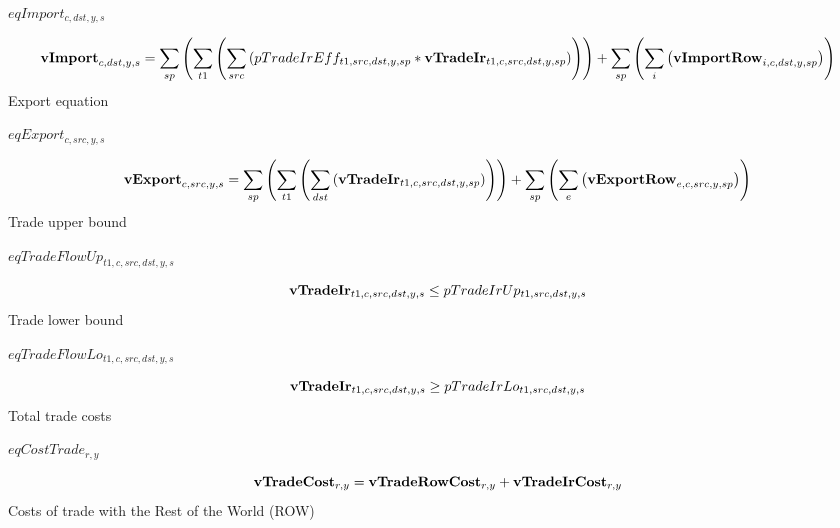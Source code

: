 \documentclass{article}
\begin{document}
$eqImport_{c,dst,y,s}$





\begin{dmath} 
{\bf vImport}_{c,dst,y,s}  =  \sum_{sp}{\left(\sum_{t1}{\left(\sum_{src}{\left(pTradeIrEff_{t1,src,dst,y,sp}*{\bf vTradeIr}_{t1,c,src,dst,y,sp}\right)}\right)}\right)}+\sum_{sp}{\left(\sum_{i}{\left({\bf vImportRow}_{i,c,dst,y,sp}\right)}\right)}
\end{dmath} 
Export equation







$eqExport_{c,src,y,s}$





\begin{dmath} 
{\bf vExport}_{c,src,y,s}  =  \sum_{sp}{\left(\sum_{t1}{\left(\sum_{dst}{\left({\bf vTradeIr}_{t1,c,src,dst,y,sp}\right)}\right)}\right)}+\sum_{sp}{\left(\sum_{e}{\left({\bf vExportRow}_{e,c,src,y,sp}\right)}\right)}
\end{dmath} 
Trade upper bound







$eqTradeFlowUp_{t1,c,src,dst,y,s}$





\begin{dmath} 
{\bf vTradeIr}_{t1,c,src,dst,y,s}  \le  pTradeIrUp_{t1,src,dst,y,s}
\end{dmath} 
Trade lower bound







$eqTradeFlowLo_{t1,c,src,dst,y,s}$





\begin{dmath} 
{\bf vTradeIr}_{t1,c,src,dst,y,s}  \ge  pTradeIrLo_{t1,src,dst,y,s}
\end{dmath} 
Total trade costs







$eqCostTrade_{r,y}$





\begin{dmath} 
{\bf vTradeCost}_{r,y}  =  {\bf vTradeRowCost}_{r,y}+{\bf vTradeIrCost}_{r,y}
\end{dmath} 
Costs of trade with the Rest of the World (ROW)
\end{document}
